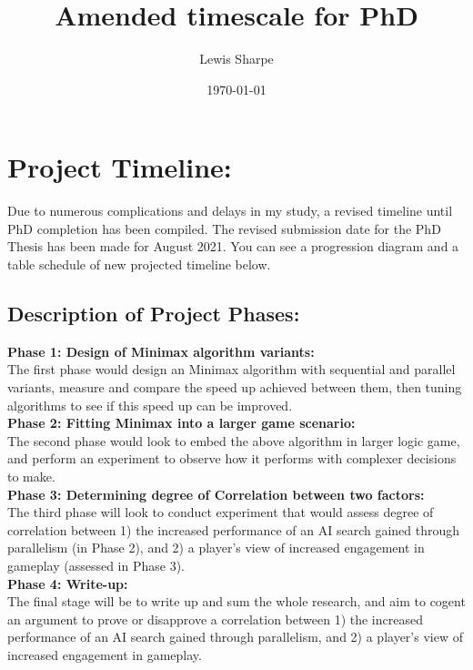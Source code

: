 \documentclass[12pt]{article}
\title{Amended timescale for PhD}
\author{
        Lewis Sharpe}
\date{\today}
\begin{document}
\maketitle
\section{Project Timeline:}
Due to numerous complications and delays in my study, a revised timeline until PhD completion has been compiled. The revised submission date for the PhD Thesis has been made for August 2021. You can see a progression diagram and a table schedule of new projected timeline below.
\subsection{Description of Project Phases:}
\colorbox{blue!30}{\textbf{Phase 1: Design of Minimax algorithm variants:}} \\
The first phase would design an Minimax algorithm with sequential and parallel variants, measure and compare the speed up achieved between them, then tuning algorithms to see if this speed up can be improved.  \\
\colorbox{green!30}{\textbf{Phase 2: Fitting Minimax into a larger game scenario:}} \\
The second phase would look to embed the above algorithm in larger logic game, and perform an experiment to observe how it performs with complexer decisions to make. \\
\colorbox{orange!30}{\textbf{Phase 3: Determining degree of Correlation between two factors:}} \\
The third phase will look to conduct experiment that would assess degree of correlation between 1) the increased performance of an AI search gained through parallelism (in Phase 2), and 2) a player's view of increased engagement in gameplay (assessed in Phase 3).  \\
\colorbox{gray!30}{\textbf{Phase 4: Write-up:}} \\
The final stage will be to write up and sum the whole research, and aim to cogent an argument to prove or disapprove a correlation between 1) the increased performance of an AI search gained through parallelism, and 2) a player's view of increased engagement in gameplay.
\end{document}

